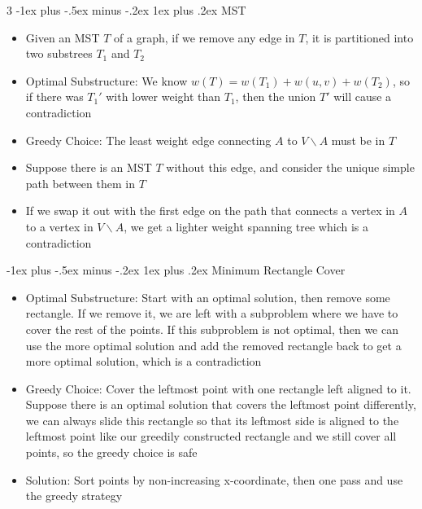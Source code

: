 \documentclass[10pt, landscape]{article}
\makeatletter
\renewcommand{\subsection}{\@startsection{subsection}{3}{0mm}%
                                {-1ex plus -.5ex minus -.2ex}%
                                {1ex plus .2ex}%
                                {\normalfont\small\bfseries}}%
\makeatother
\begin{document}
\begin{multicols*}{3}
\subsection{MST}
\begin{itemize}
    \item Given an MST $T$ of a graph, if we remove any edge in $T$, it is partitioned into two substrees $T_1$ and $T_2$
    \item Optimal Substructure: We know $w(T)=w(T_1)+w(u,v)+w(T_2)$, so if there was $T_1'$ with lower weight than $T_1$, then the union $T'$ will cause a contradiction
    \item Greedy Choice: The least weight edge connecting $A$ to $V \backslash A$ must be in $T$
    \item Suppose there is an MST $T$ without this edge, and consider the unique simple path between them in $T$
    \item If we swap it out with the first edge on the path that connects a vertex in $A$ to a vertex in $V \backslash A$, we get a lighter weight spanning tree which is a contradiction
\end{itemize}

\subsection{Minimum Rectangle Cover}
\begin{itemize}
    \item Optimal Substructure: Start with an optimal solution, then remove some rectangle. If we remove it, we are left with a subproblem where we have to cover the rest of the points. If this subproblem is not optimal, then we can use the more optimal solution and add the removed rectangle back to get a more optimal solution, which is a contradiction
    \item Greedy Choice: Cover the leftmost point with one rectangle left aligned to it. Suppose there is an optimal solution that covers the leftmost point differently, we can always slide this rectangle so that its leftmost side is aligned to the leftmost point like our greedily constructed rectangle and we still cover all points, so the greedy choice is safe
    \item Solution: Sort points by non-increasing x-coordinate, then one pass and use the greedy strategy
\end{itemize}


\end{multicols*}
\end{document}
